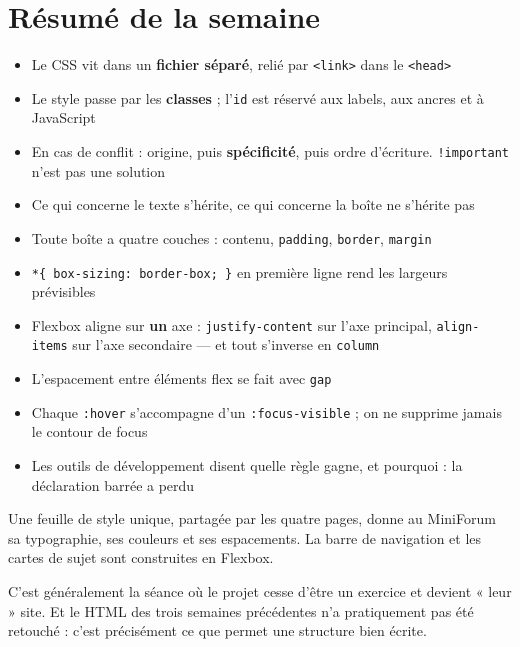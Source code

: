 \documentclass[a4paper,11pt]{article}
\begin{document}
\section*{Résumé de la semaine}

\begin{tcolorbox}[definition, title={Ce qu'il faut retenir}]
\begin{itemize}
  \item Le CSS vit dans un \textbf{fichier séparé}, relié par \texttt{<link>} dans le \texttt{<head>}
  \item Le style passe par les \textbf{classes} ; l'\texttt{id} est réservé aux labels, aux ancres et à JavaScript
  \item En cas de conflit : origine, puis \textbf{spécificité}, puis ordre d'écriture. \texttt{!important} n'est pas une solution
  \item Ce qui concerne le texte s'hérite, ce qui concerne la boîte ne s'hérite pas
  \item Toute boîte a quatre couches : contenu, \texttt{padding}, \texttt{border}, \texttt{margin}
  \item \texttt{*\{ box-sizing: border-box; \}} en première ligne rend les largeurs prévisibles
  \item Flexbox aligne sur \textbf{un} axe : \texttt{justify-content} sur l'axe principal, \texttt{align-items} sur l'axe secondaire --- et tout s'inverse en \texttt{column}
  \item L'espacement entre éléments flex se fait avec \texttt{gap}
  \item Chaque \texttt{:hover} s'accompagne d'un \texttt{:focus-visible} ; on ne supprime jamais le contour de focus
  \item Les outils de développement disent quelle règle gagne, et pourquoi : la déclaration barrée a perdu
\end{itemize}
\end{tcolorbox}

\vspace{8pt}
\begin{tcolorbox}[filrouge, title={Fil rouge --- MiniForum : le forum prend forme visuellement}]
Une feuille de style unique, partagée par les quatre pages, donne au MiniForum sa typographie, ses couleurs et ses espacements. La barre de navigation et les cartes de sujet sont construites en Flexbox.

\vspace{4pt}
C'est généralement la séance où le projet cesse d'être un exercice et devient « leur » site. Et le HTML des trois semaines précédentes n'a pratiquement pas été retouché : c'est précisément ce que permet une structure bien écrite.
\end{tcolorbox}
\end{document}

